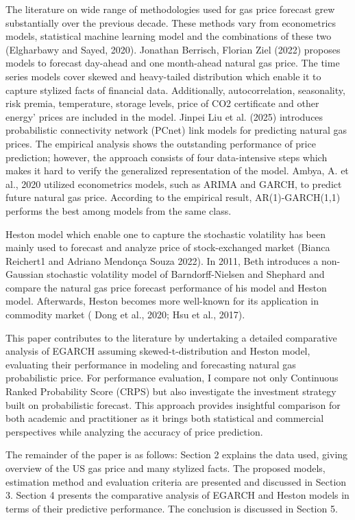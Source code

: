 \documentclass[12pt,a4paper]{article}
\numberwithin{equation}{section}
\begin{document}
The literature on wide range of methodologies used for gas price forecast grew substantially over the previous decade. These methods vary from econometrics models, statistical machine learning model and the combinations of these two (Elgharbawy and Sayed, 2020). Jonathan Berrisch, Florian Ziel (2022) proposes models to forecast day-ahead and one month-ahead natural gas price. The time series models cover skewed and heavy-tailed distribution which enable it to capture stylized facts of financial data. Additionally, autocorrelation, seasonality, risk premia, temperature, storage levels, price of CO2 certificate and other energy' prices are included in the model. Jinpei Liu et al. (2025) introduces probabilistic connectivity network (PCnet) link models for predicting natural gas prices. The empirical analysis shows the outstanding performance of price prediction; however, the approach consists of four data-intensive steps which makes it hard to verify the generalized representation of the model. Ambya, A. et al., 2020 utilized econometrics models, such as ARIMA and GARCH, to predict future natural gas price. According to the empirical result, AR(1)-GARCH(1,1) performs the best among models from the same class. 

Heston model which enable one to capture the stochastic volatility has been mainly used to forecast and analyze price of stock-exchanged market (Bianca Reichert1 and Adriano Mendonça Souza 2022). In 2011, Beth introduces a non-Gaussian stochastic volatility model of Barndorff-Nielsen and Shephard and compare the natural gas price forecast performance of his model and Heston model. Afterwards, Heston becomes more well-known for its application in commodity market ( Dong et al., 2020; Hsu et al., 2017).

This paper contributes to the literature by undertaking a detailed comparative analysis of EGARCH assuming skewed-t-distribution and Heston model, evaluating their performance in modeling and forecasting natural gas probabilistic price. For performance evaluation, I compare not only Continuous Ranked Probability Score (CRPS) but also investigate the investment strategy built on probabilistic forecast. This approach provides insightful comparison for both academic and practitioner as it brings both statistical and commercial perspectives while analyzing the accuracy of price prediction.

The remainder of the paper is as follows: Section 2 explains the data used, giving overview of the US gas price and many stylized facts. The proposed models, estimation method and evaluation criteria are presented and discussed in Section 3. Section 4 presents the comparative analysis of EGARCH and Heston models in terms of their predictive performance. The conclusion is discussed in Section 5.
\end{document}
